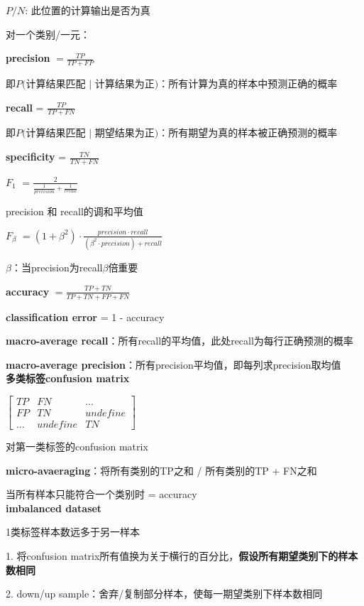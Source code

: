 \documentclass[UTF8]{ctexart}
\begin{document}
  $P/N$: 此位置的计算输出是否为真

  对一个类别/一元：

  \quad \textbf{precision} $= \frac{TP}{TP + FP}$

  \quad \quad 即$P($计算结果匹配 $|$ 计算结果为正$)$：所有计算为真的样本中预测正确的概率

  \quad \textbf{recall} = $\frac{TP}{TP + FN}$

  \quad \quad 即$P($计算结果匹配 $|$ 期望结果为正$)$：所有期望为真的样本被正确预测的概率

  \quad \textbf{specificity} = $\frac{TN}{TN + FN}$

  \quad \textbf{$F_1$} $= \frac{2}{\frac{1}{precision} + \frac{1}{recall}}$ 
  
  \quad \quad precision 和 recall的调和平均值

  \quad \textbf{$F_\beta$} $= (1 + \beta^2) \cdot \frac{precision \cdot recall}{(\beta^2 \cdot precision) + recall}$

  \quad \quad $\beta$：当precision为recall$\beta$倍重要

  \textbf{accuracy} $= \frac{TP + TN}{TP + TN + FP + FN}$

  \textbf{classification error} = 1 - accuracy
  
  \textbf{macro-average recall}：所有recall的平均值，此处recall为每行正确预测的概率

  \textbf{macro-average precision}：所有precision平均值，即每列求precision取均值\\
\textbf{多类标签confusion matrix}

  $\begin{bmatrix}
    TP & FN & ... \\
    FP & TN & undefine\\
    ... & undefine & TN
  \end{bmatrix}$
  
  对第一类标签的confusion matrix
  
  \textbf{micro-avaeraging}：将所有类别的TP之和 / 所有类别的TP + FN之和
  
  \quad 当所有样本只能符合一个类别时 = accuracy\\
\textbf{imbalanced dataset}

  1类标签样本数远多于另一样本
  
  1. 将confusion matrix所有值换为关于横行的百分比，\textbf{假设所有期望类别下的样本数相同}
  
  2. down/up sample：舍弃/复制部分样本，使每一期望类别下样本数相同
  
\end{document}
